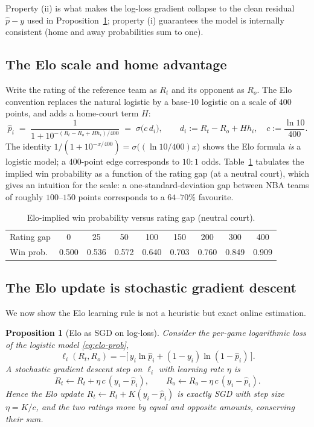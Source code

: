 \documentclass[11pt]{article}
\newtheorem{proposition}{Proposition}
\begin{document}
Property (ii) is what makes the log-loss gradient collapse to the clean residual
$\hat p - y$ used in Proposition~\ref{prop:sgd}; property (i) guarantees the model
is internally consistent (home and away probabilities sum to one).

\subsection{The Elo scale and home advantage}
Write the rating of the reference team as $R_t$ and its opponent as $R_o$. The
Elo convention replaces the natural logistic by a base-$10$ logistic on a scale
of $400$ points, and adds a home-court term $H$:
\begin{equation}
\hat p_i \;=\; \frac{1}{1 + 10^{-(R_t - R_o + H h_i)/400}}
\;=\; \sigma\!\big(c\,d_i\big), \qquad
d_i := R_t - R_o + H h_i,\quad c := \frac{\ln 10}{400}.
\label{eq:elo-prob}
\end{equation}
The identity $1/(1+10^{-x/400}) = \sigma\!\big((\ln 10/400)x\big)$ shows the Elo
formula \emph{is} a logistic model; a $400$-point edge corresponds to
$10{:}1$ odds. Table~\ref{tab:gap} tabulates the implied win probability as a
function of the rating gap (at a neutral court), which gives an intuition for the
scale: a one-standard-deviation gap between NBA teams of roughly $100$--$150$
points corresponds to a $64$--$70\%$ favourite.

\begin{table}[h]
\centering
\begin{tabular}{lcccccccc}
\toprule
Rating gap & 0 & 25 & 50 & 100 & 150 & 200 & 300 & 400 \\
Win prob. & 0.500 & 0.536 & 0.572 & 0.640 & 0.703 & 0.760 & 0.849 & 0.909 \\
\bottomrule
\end{tabular}
\caption{Elo-implied win probability versus rating gap (neutral court).}
\label{tab:gap}
\end{table}

\subsection{The Elo update is stochastic gradient descent}
We now show the Elo learning rule is not a heuristic but exact online estimation.

\begin{proposition}[Elo as SGD on log-loss]
\label{prop:sgd}
Consider the per-game logarithmic loss of the logistic model \eqref{eq:elo-prob},
\[
\ell_i(R_t, R_o) = -\big[\,y_i \ln \hat p_i + (1-y_i)\ln(1-\hat p_i)\,\big].
\]
A stochastic gradient descent step on $\ell_i$ with learning rate $\eta$ is
\[
R_t \leftarrow R_t + \eta\,c\,(y_i - \hat p_i), \qquad
R_o \leftarrow R_o - \eta\,c\,(y_i - \hat p_i).
\]
Hence the Elo update $R_t \leftarrow R_t + K(y_i - \hat p_i)$ is exactly SGD with
step size $\eta = K/c$, and the two ratings move by equal and opposite amounts,
conserving their sum.
\end{proposition}
\end{document}
